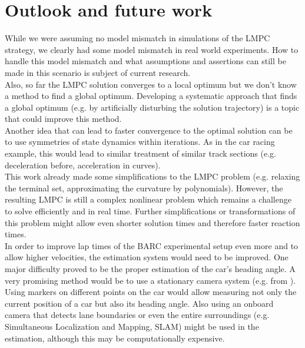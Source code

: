 \section{Outlook and future work}
While we were assuming no model mismatch in simulations of the LMPC strategy, we clearly had some model mismatch in real world experiments. How to handle this model mismatch and what assumptions and assertions can still be made in this scenario is subject of current research.\\
Also, so far the LMPC solution converges to a local optimum but we don't know a method to find a global optimum. Developing a systematic approach that finds a global optimum (e.g. by artificially disturbing the solution trajectory) is a topic that could improve this method.\\
Another idea that can lead to faster convergence to the optimal solution can be to use symmetries of state dynamics within iterations. As in the car racing example, this would lead to similar treatment of similar track sections (e.g. deceleration before, acceleration in curves).\\
This work already made some simplifications to the LMPC problem (e.g. relaxing the terminal set, approximating the curvature by polynomials). However, the resulting LMPC is still a complex nonlinear problem which remains a challenge to solve efficiently and in real time. Further simplifications or transformations of this problem might allow even shorter solution times and therefore faster reaction times.\\
In order to improve lap times of the BARC experimental setup even more and to allow higher velocities, the estimation system would need to be improved. One major difficulty proved to be the proper estimation of the car's heading angle. A very promising method would be to use a stationary camera system (e.g. from \cite{Liniger2015}). Using markers on different points on the car would allow measuring not only the current position of a car but also its heading angle. Also using an onboard camera that detects lane boundaries or even the entire surroundings (e.g. Simultaneous Localization and Mapping, SLAM) might be used in the estimation, although this may be computationally expensive.\\

